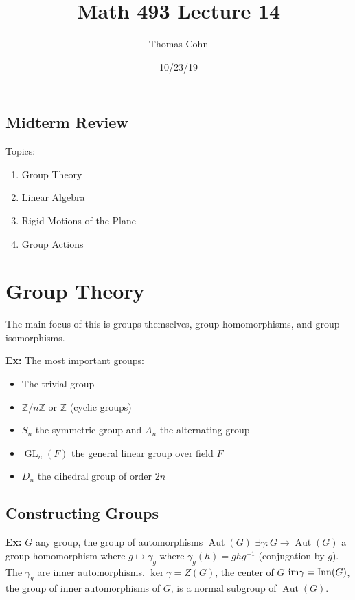 \documentclass[10pt,letterpaper]{article}
\author{Thomas Cohn}
\title{Math 493 Lecture 14}
\date{10/23/19} %
\newcommand{\n}{\hfill\break}
\newcommand{\hangblock}[2]{\par\noindent\settowidth{\hangindent}{\textbf{#1: }}\textbf{#1: }\!\!\!#2}
\newcommand{\ex}[1]{\hangblock{Ex}{#1}}
\newcommand{\integers}{\mathbb{Z}}
\newcommand{\Z}{\integers}
\newcommand{\inv}{^{-1}}
\newcommand{\im}{\textrm{\textnormal{im}}}
\DeclareMathOperator{\GL}{GL}
\DeclareMathOperator{\Aut}{Aut}
\begin{document}
\maketitle
\setlength\RaggedRightParindent{\parindent}
\RaggedRight

\renewcommand{\thesection}{\Roman{section}} 

\subsection*{Midterm Review}

\par\noindent
Topics:
\begin{enumerate}
	\item Group Theory
	\item Linear Algebra
	\item Rigid Motions of the Plane
	\item Group Actions
\end{enumerate}

\section{Group Theory}

\par\noindent
The main focus of this is groups themselves, group homomorphisms, and group isomorphisms.\n

\ex{
	The most important groups:
	\begin{itemize}[leftmargin=3\parindent]
		\item The trivial group
		\item $\Z/n\Z$ or $\Z$ (cyclic groups)
		\item $S_{n}$ the symmetric group and $A_{n}$ the alternating group
		\item $\GL_{n}(F)$ the general linear group over field $F$
		\item $D_{n}$ the dihedral group of order $2n$
	\end{itemize}
}

\subsection*{Constructing Groups}

\ex{
	$G$ any group, the group of automorphisms $\Aut(G)$\n
	$\exists\gamma:G\to\Aut(G)$ a group homomorphism where $g\mapsto\gamma_{g}$ where $\gamma_{g}(h)=ghg\inv$ (conjugation by $g$). The $\gamma_{g}$ are inner automorphisms.\n
	$\ker\gamma=Z(G)$, the center of $G$\n
	$\im\gamma=\operatorname{Inn}(G)$, the group of inner automorphisms of $G$, is a normal subgroup of $\Aut(G)$.\n
}
\end{document}
